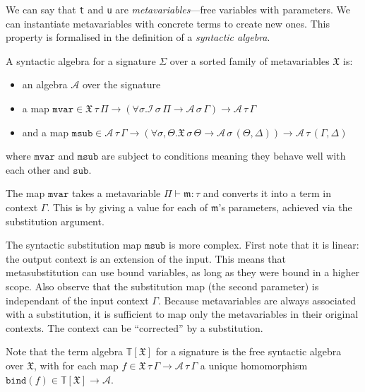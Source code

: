 \documentclass[11pt,a4paper]{article}
\newcommand*\ctxext[2]{{#1}, {#2}}
\begin{document}
We can say that \verb|t| and \verb|u| are \emph{metavariables}---free variables
with parameters. We can instantiate metavariables with concrete terms to create
new ones. This property is formalised in the definition of a \emph{syntactic
algebra}.

A syntactic algebra for a signature \(\Sigma\) over a sorted family of metavariables
\(\mathfrak{X}\) is:

\begin{itemize}
\item an algebra \(\mathcal{A}\) over the signature
\item a map \(\mathtt{mvar} \in {{\mathfrak{X}\,\tau\,\Pi} \to (\forall \sigma. {{\mathcal{I}\,\sigma\,\Pi} \to {\mathcal{A}\,\sigma\,\Gamma}}) \to
  {\mathcal{A}\,\tau\,\Gamma}}\)
\item and a map \(\mathtt{msub} \in {{\mathcal{A}\,\tau\,\Gamma} \to (\forall {\sigma, \Theta}. {{\mathfrak{X}\,\sigma\,\Theta} \to
  {\mathcal{A}\,\sigma\,(\ctxext{\Theta}{\Delta})}}) \to {\mathcal{A}\,\tau\,(\ctxext{\Gamma}{\Delta})}}\)
\end{itemize}

where \(\mathtt{mvar}\) and \(\mathtt{msub}\) are subject to conditions meaning
they behave well with each other and \(\mathtt{sub}\)\footnotemark{}.


The map \(\mathtt{mvar}\) takes a metavariable \(\Pi \vdash \mathfrak{m} : \tau\) and converts it
into a term in context \(\Gamma\). This is by giving a value for each of \(\mathfrak{m}\)'s
parameters, achieved via the substitution argument.

The syntactic substitution map \(\mathtt{msub}\) is more complex. First note
that it is linear: the output context is an extension of the input. This means
that metasubstitution can use bound variables, as long as they were bound in a
higher scope. Also observe that the substitution map (the second parameter) is
independant of the input context \(\Gamma\). Because metavariables are always
associated with a substitution, it is sufficient to map only the metavariables
in their original contexts. The context can be ``corrected'' by a substitution.

Note that the term algebra \(\mathbb{T}[\mathfrak{X}]\) for a signature is the free syntactic
algebra over \(\mathfrak{X}\), with for each map \(f \in {{\mathfrak{X}\,\tau\,\Gamma}\to{\mathcal{A}\,\tau\,\Gamma}}\) a
unique homomorphism \(\mathtt{bind}(f) \in {{\mathbb{T}[\mathfrak{X}]} \to \mathcal{A}}\).
\end{document}
